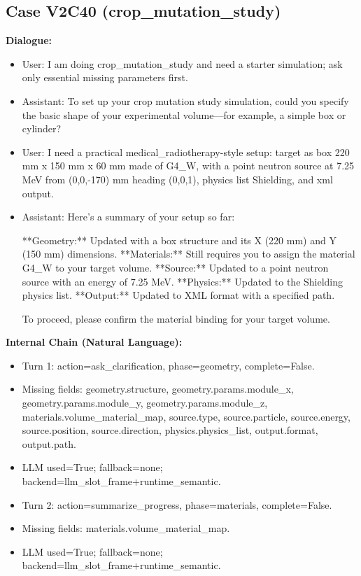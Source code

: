 \documentclass[11pt]{ctexart}
\begin{document}
\subsection{Case V2C40 (crop\_mutation\_study)}
\textbf{Dialogue:}
\begin{itemize}
\item User: I am doing crop\_mutation\_study and need a starter simulation; ask only essential missing parameters first.
\item Assistant: To set up your crop mutation study simulation, could you specify the basic shape of your experimental volume—for example, a simple box or cylinder?
\item User: I need a practical medical\_radiotherapy-style setup: target as box 220 mm x 150 mm x 60 mm made of G4\_W, with a point neutron source at 7.25 MeV from (0,0,-170) mm heading (0,0,1), physics list Shielding, and xml output.
\item Assistant: Here's a summary of your setup so far:

**Geometry:** Updated with a box structure and its X (220 mm) and Y (150 mm) dimensions.
**Materials:** Still requires you to assign the material G4\_W to your target volume.
**Source:** Updated to a point neutron source with an energy of 7.25 MeV.
**Physics:** Updated to the Shielding physics list.
**Output:** Updated to XML format with a specified path.

To proceed, please confirm the material binding for your target volume.
\end{itemize}
\textbf{Internal Chain (Natural Language):}
\begin{itemize}
\item Turn 1: action=ask\_clarification, phase=geometry, complete=False.
\item Missing fields: geometry.structure, geometry.params.module\_x, geometry.params.module\_y, geometry.params.module\_z, materials.volume\_material\_map, source.type, source.particle, source.energy, source.position, source.direction, physics.physics\_list, output.format, output.path.
\item LLM used=True; fallback=none; backend=llm\_slot\_frame+runtime\_semantic.
\item Turn 2: action=summarize\_progress, phase=materials, complete=False.
\item Missing fields: materials.volume\_material\_map.
\item LLM used=True; fallback=none; backend=llm\_slot\_frame+runtime\_semantic.
\end{itemize}
\end{document}
